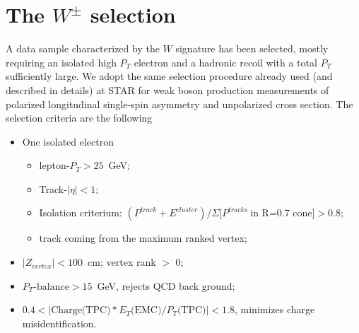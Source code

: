 \documentclass[12pt]{article}
\begin{document}




\section{The $W^{\pm}$ selection}
\label{Wselection}
A data sample characterized by the $W$ signature has been selected, mostly requiring an isolated high $P_{T}$ electron and a hadronic recoil with a total $P_{T}$ sufficiently large. We adopt the same selection procedure already used (and described in details) at STAR for weak boson production measurements of polarized longitudinal single-spin asymmetry\cite{STAR_W_AL_2009-paper, STAR_W_AL_2009-note, STAR_W_AL_2012-paper, STAR_W_AL_2012-note} and unpolarized cross section\cite{STAR_W_xSec_2009-paper,STAR_W_xSec_2009-note}. The selection criteria are the following

\begin{itemize}
\item One isolated electron
    \begin{itemize}
    \item lepton-$P_{T}>25$~GeV;
    \item Track-$|\eta|<1$;
    \item Isolation criterium: $(P^{track}+E^{cluster})/\Sigma[P^{tracks}~\text{in R=0.7 cone]} > 0.8$;
    \item track coming from the maximum ranked vertex;
    \end{itemize}
\item $|Z_{vertex}| < 100$~cm; vertex rank $>$ 0;    
\item $P_{T}\text{-balance} > 15$~GeV, rejects QCD back ground;
\item $0.4 < |\text{Charge(TPC)}*E_{T}\text{(EMC)}/P_{T}\text{(TPC)}| < 1.8$, minimizes charge misidentification.
\end{itemize}
\end{document}
